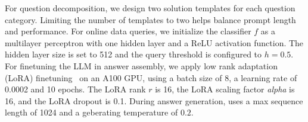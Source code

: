 For question decomposition, we design two solution templates for each question category. Limiting the number of templates to two helps balance prompt length and performance.
For online data queries, we initialize the classifier $f$ as a multilayer perceptron with one hidden layer and a ReLU activation function. The hidden layer size is set to 512 and the query threshold is configured to $h = 0.5$.
For finetuning the LLM in answer assembly, we apply low rank adaptation (LoRA) finetuning~\cite{hu2021lora} on an A100 GPU, using a batch size of 8, a learning rate of 0.0002 and 10 epochs.
The LoRA rank $r$ is 16, the LoRA scaling factor \textit{alpha} is 16, and the LoRA dropout is 0.1.
During answer generation, \Method uses a max sequence length of 1024 and a geberating temperature of $0.2$.
%
